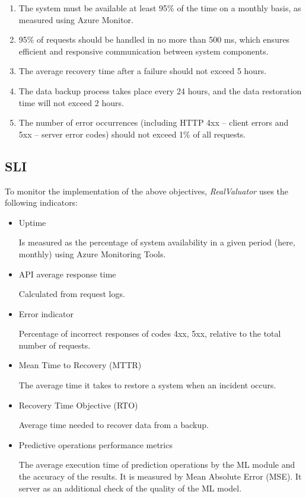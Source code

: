 \documentclass{article}
\begin{document}
\begin{enumerate}
    \item The system must be available at least 95\% of the time on a monthly basis, as measured using Azure Monitor.

    \item 95\% of requests should be handled in no more than 500 ms, which ensures efficient and responsive communication between system components.

    \item The average recovery time after a failure should not exceed 5 hours.

    \item The data backup process takes place every 24 hours, and the data restoration time will not exceed 2 hours.

    \item The number of error occurrences (including HTTP 4xx -- client errors and 5xx -- server error codes) should not exceed 1\% of all requests.
\end{enumerate}

\subsection{SLI}
To monitor the implementation of the above objectives, \textit{RealValuator} uses the following indicators:

\begin{itemize}
    \item Uptime

Is measured as the percentage of system availability in a given period (here, monthly) using Azure Monitoring Tools.

    \item API average response time 

Calculated from request logs.


    \item Error indicator

Percentage of incorrect responses of codes 4xx, 5xx, relative to the total number of requests.

    \item Mean Time to Recovery (MTTR)

The average time it takes to restore a system when an incident occurs.

    \item Recovery Time Objective (RTO)


Average time needed to recover data from a backup.

    \item Predictive operations performance metrics 

The average execution time of prediction operations by the ML module and the accuracy of the results. It is measured by Mean Absolute Error (MSE). It server as an additional check of the quality of the ML model.

\end{itemize}
\end{document}
